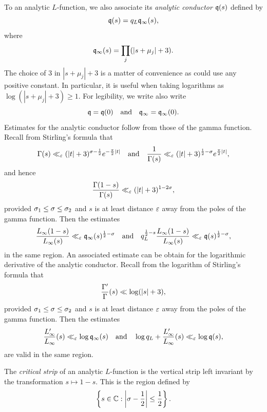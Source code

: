 \documentclass[12pt]{article}
\begin{document}
    To an analytic \(L\)-function, we also associate its \textit{analytic conductor} \(\mathfrak{q}(s)\) defined by
    \[
      \mathfrak{q}(s) = q_{L}\mathfrak{q}_{\infty}(s),
    \]
    where
    \[
      \mathfrak{q}_{\infty}(s) = \prod_{j}(|s+\mu_{j}|+3).
    \]
    The choice of \(3\) in \(|s+\mu_{j}|+3\) is a matter of convenience as could use any positive constant. In particular, it is useful when taking logarithms as \(\log(|s+\mu_{j}|+3) \ge 1\). For legibility, we write also write
    \[
      \mathfrak{q} = \mathfrak{q}(0) \quad \text{and} \quad \mathfrak{q}_{\infty} = \mathfrak{q}_{\infty}(0).
    \]
    Estimates for the analytic conductor follow from those of the gamma function. Recall from Stirling's formula that
    \[
      \Gamma(s) \ll_{\varepsilon} (|t|+3)^{\sigma-\frac{1}{2}}e^{-\frac{\pi}{2}|t|} \quad \text{and} \quad \frac{1}{\Gamma(s)} \ll_{\varepsilon} (|t|+3)^{\frac{1}{2}-\sigma}e^{\frac{\pi}{2}|t|},
    \]
    and hence
    \[
      \frac{\Gamma(1-s)}{\Gamma(s)} \ll_{\varepsilon} (|t|+3)^{1-2\sigma},
    \]
    provided \(\sigma_{1} \le \sigma \le \sigma_{2}\) and \(s\) is at least distance \(\varepsilon\) away from the poles of the gamma function. Then the estimates
     \begin{equation}\label{equ:gamma_factor_analytic_conductor_estimate}
      \frac{L_{\infty}(1-s)}{L_{\infty}(s)} \ll_{\varepsilon} \mathfrak{q}_{\infty}(s)^{\frac{1}{2}-\sigma} \quad \text{and} \quad q_{L}^{\frac{1}{2}-s}\frac{L_{\infty}(1-s)}{L_{\infty}(s)} \ll_{\varepsilon} \mathfrak{q}(s)^{\frac{1}{2}-\sigma},
    \end{equation}
    in the same region. An associated estimate can be obtain for the logarithmic derivative of the analytic conductor. Recall from the logarithm of Stirling's formula that
    \[
      \frac{\Gamma'}{\Gamma}(s) \ll \log(|s|+3),
    \]
    provided \(\sigma_{1} \le \sigma \le \sigma_{2}\) and \(s\) is at least distance \(\varepsilon\) away from the poles of the gamma function. Then the estimates
    \begin{equation}\label{equ:digamma_gamma_factor_analytic_conductor_estimate}
      \frac{L_{\infty}'}{L_{\infty}}(s) \ll_{\varepsilon} \log\mathfrak{q}_{\infty}(s) \quad \text{and} \quad \log{q_{L}}+\frac{L_{\infty}'}{L_{\infty}}(s) \ll_{\varepsilon} \log\mathfrak{q}(s),
    \end{equation}
    are valid in the same region.

    The \textit{critical strip} of an analytic \(L\)-function is the vertical strip left invariant by the transformation \(s \mapsto 1-s\). This is the region defined by
    \[
      \left\{s \in \mathbb{C}:\left|\sigma-\frac{1}{2}\right| \le \frac{1}{2}\right\}.
    \]
\end{document}
